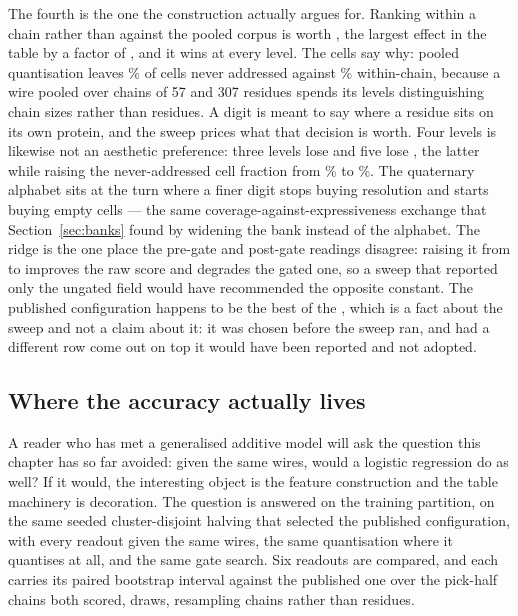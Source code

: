 \documentclass[11pt]{article}
\begin{document}
The fourth is the one the construction actually argues for. Ranking within a chain
rather than against the pooled corpus is worth \SensRankingSpread{}, the largest
effect in the table by a factor of \SensRankingOverNext{}, and it wins at every
level. The cells say why: pooled quantisation leaves
\SensLevelsFourPooledEmpty{}\% of cells never addressed against
\SensLevelsFourEmpty{}\% within-chain, because a wire pooled over chains of 57 and
307 residues spends its levels distinguishing chain sizes rather than residues. A
digit is meant to say where a residue sits on its own protein, and the sweep
prices what that decision is worth. Four levels is likewise not an aesthetic
preference: three levels lose \SensLevelsThreeDelta{} and five lose
\SensLevelsFiveDelta{}, the latter while raising the never-addressed cell fraction
from \SensLevelsFourEmpty{}\% to \SensLevelsFiveEmpty{}\%. The quaternary alphabet
sits at the turn where a finer digit stops buying resolution and starts buying
empty cells --- the same coverage-against-expressiveness exchange that
Section~\ref{sec:banks} found by widening the bank instead of the alphabet. The
ridge is the one place the pre-gate and post-gate readings disagree: raising it
from \TabRidgeLowValue{} to \TabRidgeHighValue{} improves the raw score and
degrades the gated one, so a sweep that reported only the ungated field would have
recommended the opposite constant. The published configuration happens to be the
best of the \SensSettings{}, which is a fact about the sweep and not a claim about
it: it was chosen before the sweep ran, and had a different row come out on top it
would have been reported and not adopted.

\subsection{Where the accuracy actually lives}
\label{sec:readouts}
A reader who has met a generalised additive model will ask the question this
chapter has so far avoided: given the same \NTabWires{} wires, would a logistic
regression do as well? If it would, the interesting object is the feature
construction and the table machinery is decoration. The question is answered on
the training partition, on the same seeded cluster-disjoint halving that selected
the published configuration, with every readout given the same wires, the same
quantisation where it quantises at all, and the same gate search. Six readouts
are compared, and each carries its paired bootstrap interval against the
published one over the \RdNPaired{} pick-half chains both scored,
\RdBoot{} draws, resampling chains rather than residues.
\end{document}

